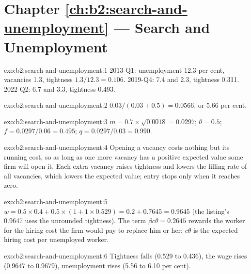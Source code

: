 \section*{Chapter \ref{ch:b2:search-and-unemployment} --- Search and Unemployment}

\begin{solution}{exo:b2:search-and-unemployment:1}
2013-Q1: unemployment 12.3 per cent, vacancies 1.3, tightness $1.3/12.3 = 0.106$. 2019-Q4: 7.4 and 2.3, tightness 0.311. 2022-Q2: 6.7 and 3.3, tightness 0.493.
\end{solution}

\begin{solution}{exo:b2:search-and-unemployment:2}
$0.03/(0.03 + 0.5) = 0.0566$, or 5.66 per cent.
\end{solution}

\begin{solution}{exo:b2:search-and-unemployment:3}
$m = 0.7 \times \sqrt{0.0018} = 0.0297$; $\theta = 0.5$; $f = 0.0297/0.06 = 0.495$; $q = 0.0297/0.03 = 0.990$.
\end{solution}

\begin{solution}{exo:b2:search-and-unemployment:4}
Opening a vacancy costs nothing but its running cost, so as long as one more vacancy has a positive expected value some
firm will open it. Each extra vacancy raises tightness and lowers the filling rate of all vacancies, which lowers the
expected value; entry stops only when it reaches zero.
\end{solution}

\begin{solution}{exo:b2:search-and-unemployment:5}
$w = 0.5 \times 0.4 + 0.5 \times (1 + 1 \times 0.529) = 0.2 + 0.7645 = 0.9645$ (the listing's 0.9647 uses the unrounded tightness). The term $\beta c\theta = 0.2645$ rewards the worker for the hiring cost the firm
would pay to replace him or her: $c\theta$ is the expected hiring cost per unemployed worker.
\end{solution}

\begin{solution}{exo:b2:search-and-unemployment:6}
Tightness falls (0.529 to 0.436), the wage rises (0.9647 to 0.9679), unemployment rises (5.56 to 6.10 per cent).
\end{solution}

